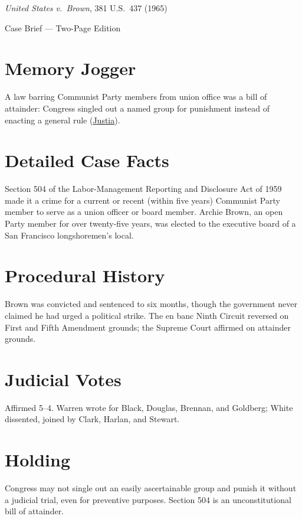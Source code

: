 \documentclass[12pt]{article}
\begin{document}
\begin{center}
{\LARGE \textit{United States v.\ Brown}, 381 U.S.\ 437 (1965)\par}
\vspace{0.5em}
{\large Case Brief --- Two-Page Edition\par}
\end{center}

\section{Memory Jogger}
A law barring Communist Party members from union office was a bill of attainder: Congress singled out a named group for punishment instead of enacting a general rule (\href{https://supreme.justia.com/cases/federal/us/381/437/}{Justia}).

\section{Detailed Case Facts}
Section 504 of the Labor-Management Reporting and Disclosure Act of 1959 made it a crime for a current or recent (within five years) Communist Party member to serve as a union officer or board member. Archie Brown, an open Party member for over twenty-five years, was elected to the executive board of a San Francisco longshoremen's local.

\section{Procedural History}
Brown was convicted and sentenced to six months, though the government never claimed he had urged a political strike. The en banc Ninth Circuit reversed on First and Fifth Amendment grounds; the Supreme Court affirmed on attainder grounds.

\section{Judicial Votes}
Affirmed 5--4. Warren wrote for Black, Douglas, Brennan, and Goldberg; White dissented, joined by Clark, Harlan, and Stewart.

\section{Holding}
Congress may not single out an easily ascertainable group and punish it without a judicial trial, even for preventive purposes. Section 504 is an unconstitutional bill of attainder.
\end{document}
